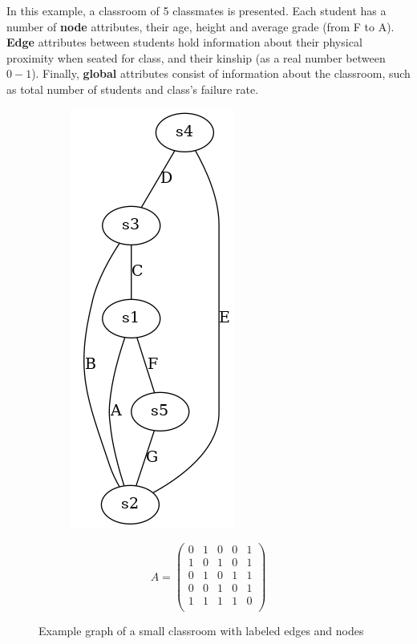   \begin{example}
    In this example, a classroom of 5 classmates is presented. Each student
    has a number of \textbf{node} attributes, their age, height and average
    grade (from F to A). \textbf{Edge} attributes between students hold
    information about their physical proximity when seated for class,
    and their kinship (as a real number between $0-1$). Finally,
    \textbf{global} attributes consist of information about the classroom,
    such as total number of students and class's failure rate.
    \begin{figure}[!h]
     \begin{subfigure}[c]{0.4\textwidth}
         \centering
         \includegraphics[scale=0.45]{Figures/chapter1/example_node_properties.png}
     \end{subfigure}
     \hfill
     \begin{subfigure}[c]{0.4\textwidth}
       \centering
       \begin{equation*}
         A = 
\begin{pmatrix}
0 & 1 & 0 & 0 & 1 \\
1 & 0 & 1 & 0 & 1 \\
0 & 1 & 0 & 1 & 1 \\
0 & 0 & 1 & 0 & 1 \\
1 & 1 & 1 & 1 & 0 \\ 
\end{pmatrix} \end{equation*}
\label{table:properties_example}
\end{subfigure}
  \caption{Example graph of a small classroom with labeled edges and nodes}
  \label{fig:properties_example}
\end{figure}


\end{example}
